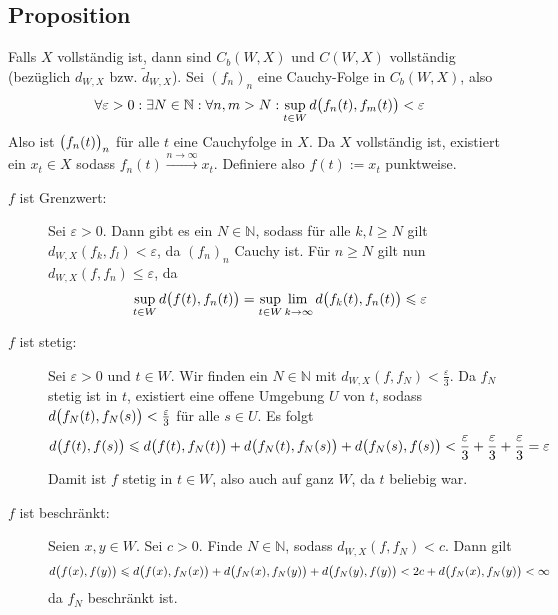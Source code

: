 \subsection[Proposition: $X$ vollständig $\Rightarrow$ $C_b(W,X)$ und $C(W,X)$ vollständig]{Proposition} %
\label{sub:18}
Falls $X$ vollständig ist, dann sind $C_b(W,X)$ und $C(W,X)$ vollständig (bezüglich $d_{W,X}$ bzw. $\tilde{d}_{W,X}$).
Sei $(f_n)_n$ eine Cauchy-Folge in $C_b(W,X)$, also
\[
	\forall \varepsilon>0 : \exists N \in \mathds{N} : \forall n,m >N : \sup_{t \in W} d \enbrace[\big]{f_n(t), f_m(t)}< \varepsilon 
\]
Also ist $\enbrace[\big]{f_n(t)}_n$ für alle $t$ eine Cauchyfolge in $X$. Da $X$ vollständig ist, existiert ein $x_t \in X$ sodass 
$f_n(t) \xrightarrow{n \to \infty} x_t$. Definiere also $f(t) := x_t$ punktweise.
\begin{description}
	\item[$f$ ist Grenzwert:] Sei $\varepsilon>0$. Dann gibt es ein $N\in\mathds{N}$, sodass für alle $k,l\ge N$ gilt $d_{W,X}(f_k,f_l)<\varepsilon$, da $(f_n)_n$ Cauchy ist.
	Für $n \ge N$ gilt nun $d_{W,X}(f,f_n)\le\varepsilon$, da 
	\[
		\sup_{t\in W} d \enbrace[\big]{f(t),f_n(t)} = \adjustlimits \sup_{t\in W} \lim_{k \to \infty} d \enbrace[\big]{f_k(t),f_n(t)} \le \varepsilon
	\]
	\item[$f$ ist stetig:] Sei $\varepsilon>0$ und $t \in W$. Wir finden ein $N \in \mathds{N}$ mit $d_{W,X}(f,f_N)<\frac{\varepsilon}{3}$. Da $f_N$ stetig ist in $t$,
	existiert eine offene Umgebung $U$ von $t$, sodass $d \enbrace[\big]{f_N(t),f_N(s)}< \frac{\varepsilon}{3}$ für alle $s \in U$. Es folgt
	\[
		d \enbrace[\big]{f(t),f(s)} \le d \enbrace[\big]{f(t), f_N(t)} + d \enbrace[\big]{f_N(t),f_N(s)} + d \enbrace[\big]{f_N(s),f(s)} < 
		\frac{\varepsilon}{3}+\frac{\varepsilon}{3}+\frac{\varepsilon}{3} = \varepsilon     
	\]
	Damit ist $f$ stetig in $t \in W$, also auch auf ganz $W$, da $t$ beliebig war.
	\item[$f$ ist beschränkt:] Seien $x,y \in W$. Sei $c>0$. Finde $N \in \mathds{N}$, sodass $d_{W,X}(f,f_N) < c$. Dann gilt
	\[
		d \enbrace[\big]{f(x),f(y)} \le d \enbrace[\big]{f(x), f_N(x)} + d \enbrace[\big]{f_N(x),f_N(y)} + d \enbrace[\big]{f_N(y),f(y)} < 
		2c + d \enbrace[\big]{f_N(x),f_N(y)} < \infty
	\]
	da $f_N$ beschränkt ist. \bewende
\end{description}

